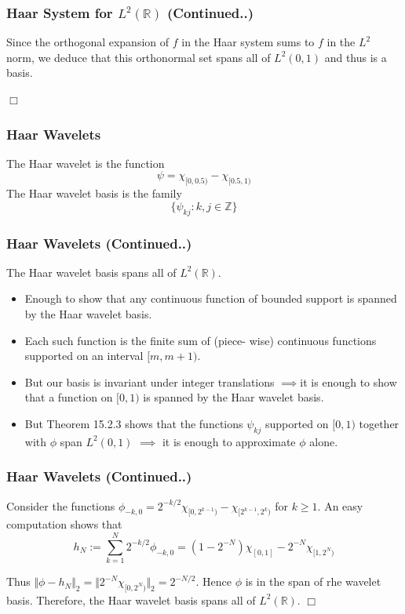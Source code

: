 \documentclass{beamer}
\newcommand{\qedwhite}{\hfill \ensuremath{\Box}}
\begin{document}
\begin{frame}
    \frametitle{Haar System for  $L^2\left({\mathbb{R}}\right)$ (Continued..)}
    Since the orthogonal expansion of $f$ in the Haar system sums to $f $ in the $L^2$ norm,
we deduce that this orthonormal set spans all of $L^2(0,1)$ and thus is a basis.

\qedwhite

\end{frame}

\begin{frame}
\frametitle{Haar Wavelets}

\begin{definition}[15.2.4]
    The Haar wavelet is the function $$\psi = \chi_{[0, 0.5)} - \chi_{[0.5, 1)}$$
    The Haar wavelet basis is the family $$\{\psi_{kj}: k,j \in \mathbb{Z} \}$$
\end{definition}

\end{frame}

\begin{frame}
\frametitle{Haar Wavelets (Continued..)}

\begin{theorem}[15.2.5]
    The Haar wavelet basis spans all of $L^2(\mathbb{R})$.
\end{theorem}

\linebreak
\begin{itemize}
    \item Enough to show that any continuous function of bounded support is spanned by the Haar wavelet basis. 
    \item Each such function is the finite sum of (piece- wise) continuous functions supported on an interval $[m,m+1)$.
    \item But our basis is invariant under integer translations $\implies$it is enough to show that a function on $[0, 1)$ is spanned by the Haar wavelet basis.
    \item But Theorem 15.2.3 shows that the functions $\psi_{kj}$ supported on $[0,1)$ together with $\phi$ span $L^2(0,1)$ $\implies$ it is enough to approximate $\phi$ alone.
\end{itemize}    

\end{frame}

\begin{frame}
    \frametitle{Haar Wavelets (Continued..)}

    Consider the functions $\phi_{-k,0} = 2^{-k/2}\chi_{[0,2^{k-1})}-\chi_{[2^{k-1}, 2^k)}$ for $k \ge 1$. An easy computation shows that
    $$h_N := \sum_{k=1}^{N}2^{-k/2}\phi_{-k,0} = (1-2^{-N})\chi_{[0, 1]} - 2^{-N}\chi_{[1,2^N)}$$

        Thus $\Vert \phi - h_N \Vert_2 = \Vert 2^{-N}\chi_{[0,2^N)}\Vert_2 = 2^{-N/2}$. Hence $\phi$ is in the span of rhe wavelet
        basis. Therefore, the Haar wavelet basis spans all of $L^2(\mathbb{R})$.
        \qedwhite

    \end{frame}
\end{document}
